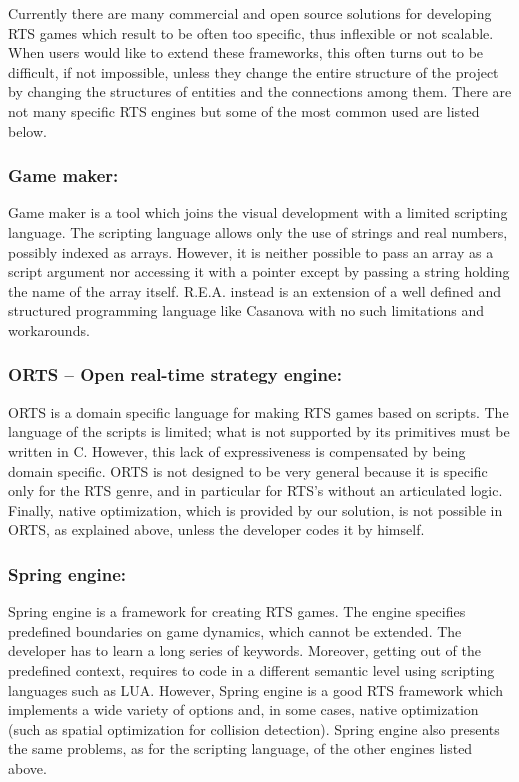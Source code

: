 Currently there are many commercial and open source solutions for developing RTS games which result to be often too specific, thus inflexible or not scalable. When users would like to extend these frameworks, this often turns out to be difficult, if not impossible, unless they change the entire structure of the project by changing the structures of entities and the connections among them.
There are not many specific RTS engines but some of the most common used are listed below.
\subsubsection*{Game maker:}
Game maker is a tool which joins the visual development with a limited scripting language. The scripting language allows only the use of strings and real numbers, possibly indexed as arrays. However, it is neither possible to pass an array as a script argument nor accessing it with a pointer except by passing a string holding the name of the array itself. R.E.A. instead is an extension of a well defined and structured programming language like Casanova with no such limitations and workarounds.
\subsubsection*{ORTS – Open real-time strategy engine:}
ORTS is a domain specific language for making RTS games based on scripts. The language of the scripts is limited; what is not supported by its primitives must be written in C. However, this lack of expressiveness is compensated by being domain specific. ORTS is not designed to be very general because it is specific only for the RTS genre, and in particular for RTS's without an articulated logic. Finally, native optimization, which is provided by our solution, is not possible in ORTS, as explained above, unless the developer codes it by himself.
\subsubsection*{Spring engine:}
Spring engine is a framework for creating RTS games. The engine specifies predefined boundaries on game dynamics, which cannot be extended. The developer has to learn a long series of keywords. Moreover, getting out of the predefined context, requires to code in a different semantic level using scripting languages such as LUA. However, Spring engine is a good RTS framework which implements a wide variety of options and, in some cases, native optimization (such as spatial optimization for collision detection). Spring engine also presents the same problems, as for the scripting language, of the other engines listed above.